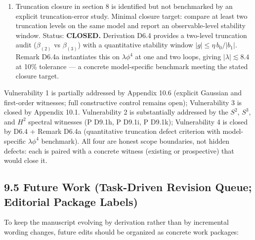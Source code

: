 \documentclass[
]{article}
\begin{document}
\begin{enumerate}
  D8.2a.
\item
  Truncation closure in section 8 is identified but not benchmarked by
  an explicit truncation-error study. Minimal closure target: compare at
  least two truncation levels on the same model and report an
  observable-level stability window. Status: \textbf{CLOSED.} Derivation
  D6.4 provides a two-level truncation audit (\(\beta_{(2)}\) vs
  \(\beta_{(3)}\)) with a quantitative stability window
  \(|g|\le\eta\,b_0/|b_1|\). Remark D6.4a instantiates this on
  \(\lambda\phi^4\) at one and two loops, giving
  \(|\lambda|\lesssim 8.4\) at 10\% tolerance --- a concrete
  model-specific benchmark meeting the stated closure target.
\end{enumerate}

Vulnerability 1 is partially addressed by Appendix 10.6 (explicit
Gaussian and first-order witnesses; full constructive control remains
open); Vulnerability 3 is closed by Appendix 10.1. Vulnerability 2 is
substantially addressed by the \(S^2\), \(S^3\), and \(H^2\) spectral
witnesses (P D9.1h, P D9.1i, P D9.1k); Vulnerability 4 is closed by D6.4
+ Remark D6.4a (quantitative truncation defect criterion with
model-specific \(\lambda\phi^4\) benchmark). All four are honest scope
boundaries, not hidden defects: each is paired with a concrete witness
(existing or prospective) that would close it.

\subsection{9.5 Future Work (Task-Driven Revision Queue; Editorial
Package
Labels)}\label{future-work-task-driven-revision-queue-editorial-package-labels}

To keep the manuscript evolving by derivation rather than by incremental
wording changes, future edits should be organized as concrete work
packages:
\end{document}
